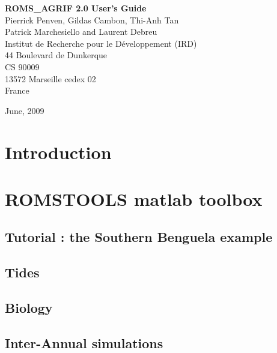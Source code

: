 \documentclass[11pt]{book}
\begin{document}
\thispagestyle{empty}
\pagestyle{plain}
\begin{center}
\vspace{3 cm}
{\huge \bf ROMS\_AGRIF 2.0 User's Guide }\\
\vspace{2 cm}
{\Large Pierrick Penven, Gildas Cambon, Thi-Anh Tan \\ 
Patrick Marchesiello and Laurent Debreu}\\ 
\vspace{1 cm}
{\Large Institut de Recherche pour le D\'eveloppement (IRD)}\\
\vspace{0.5 cm}
{\large 44 Boulevard de Dunkerque} \\
{\large CS 90009} \\
{\large 13572 Marseille cedex 02} \\
{\Large France} \\
\vspace{2cm}
\centerline{}
\vspace{1cm}
{June, 2009}
\end{center}
\chapter*{Introduction}

\newpage
\tableofcontents
\newpage
\chapter{ROMSTOOLS matlab toolbox}



\section{Tutorial : the Southern Benguela example}


\section{Tides}


\section{Biology}


\section{Inter-Annual simulations}

\end{document}
